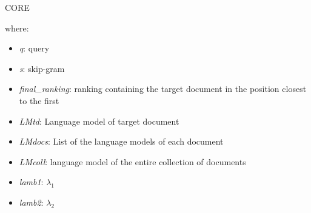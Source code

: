 \begin{frame}[fragile]{CORE}
\begin{minipage}{\linewidth}
\begin{minipage}{0.37\linewidth}
            \scriptsize
            where:
            \begin{itemize}
                \item \emph{q}: query
                \item \emph{s}: skip-gram
                \item \emph{final\_ranking}: ranking containing the target document in the position closest to the first
                \item \emph{LMtd}: Language model of target document 
                \item \emph{LMdocs}: List of the language models of each document
                \item \emph{LMcoll}: language model of the entire collection of documents
                \item \emph{lamb1}: $\lambda_1$
                \item \emph{lamb2}: $\lambda_2$
            \end{itemize}
        \end{minipage}
    \end{minipage}    
\end{frame}

